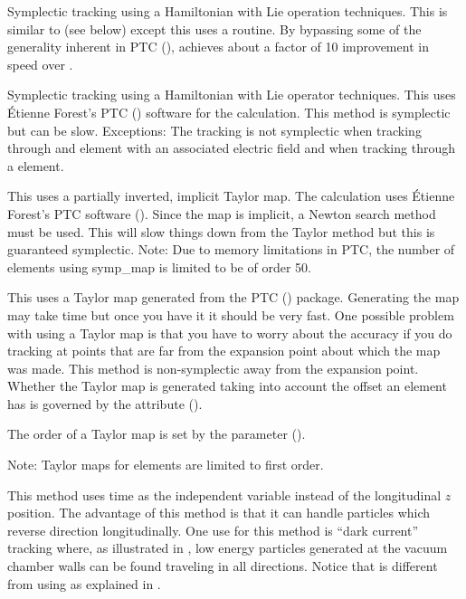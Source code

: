 \begin{description}
\item[\vn{Symp_Lie_Bmad}]
Symplectic tracking using a Hamiltonian with Lie operation techniques.
This is similar to  (see below) except this uses a
\bmad routine. By bypassing some of the generality inherent in PTC
(),  achieves about a factor of 10
improvement in speed over .

\item[\vn{Symp_Lie_PTC}]
Symplectic tracking using a Hamiltonian with Lie operator techniques.
This uses \'Etienne Forest's PTC () software for the
calculation. This method is symplectic but can be slow. Exceptions: The tracking is
not symplectic when tracking through and element with an associated electric field
and when tracking through a  element. 

\item[\vn{Symp_Map}]
This uses a partially inverted, implicit Taylor map. The calculation
uses \'Etienne Forest's PTC software ().  Since the
map is implicit, a Newton search method must be used. This will slow
things down from the Taylor method but this is guaranteed
symplectic. Note: Due to memory limitations in PTC, the number of
elements using symp_map is limited to be of order 50.

\item[\vn{Taylor}]
This uses a Taylor map generated from the PTC ()
package. Generating the map may take time but once you have it it
should be very fast. One possible problem with using a Taylor map is
that you have to worry about the accuracy if you do tracking at points
that are far from the expansion point about which the map was
made. This method is non-symplectic away from the expansion
point. Whether the Taylor map is generated taking into account the
offset an element has is governed by the 
attribute ().  

The order of a Taylor map is set by the 
parameter ().

Note: Taylor maps for  elements are limited to first order.

\item[\vn{Time_Runge_Kutta}]
This method uses time as the independent variable instead of the longitudinal $z$
position. The advantage of this method is that it can handle particles which reverse
direction longitudinally.  One use for this method is ``dark current'' tracking where, as
illustrated in , low energy particles generated at the vacuum chamber
walls can be found traveling in all directions. Notice that  is
different from using  as explained in .

\end{description}

